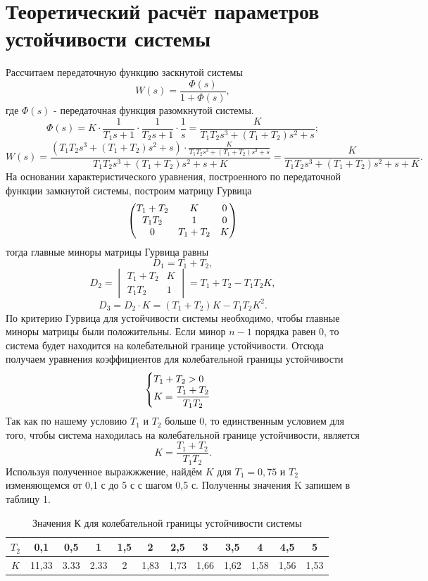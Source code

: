 \documentclass[a4paper, 11pt, russian]{article}
\begin{document}
    \section{Теоретический расчёт параметров устойчивости системы}
    Рассчитаем передаточную функцию заскнутой системы
    $$W(s) = \frac{\Phi(s)}{1 + \Phi(s)},$$ где $\Phi(s)$ - передаточная функция разомкнутой системы.
    $$\Phi(s) = K\cdot\frac{1}{T_1s + 1}\cdot\frac{1}{T_2s + 1}\cdot\frac{1}{s} = \frac{K}{T_1T_2s^3 + (T_1 + T_2)s^2 +s};$$
    $$W(s) = \frac{(T_1T_2s^3 + (T_1 + T_2)s^2 +s)\cdot\displaystyle{\frac{K}{T_1T_2s^3 + (T_1 + T_2)s^2 +s}}}{T_1T_2s^3 + (T_1 + T_2)s^2 +s + K} = \frac{K}{T_1T_2s^3 + (T_1 + T_2)s^2 +s + K}.$$
    На основании характеристического уравнения, построенного по передаточной функции замкнутой системы, построим матрицу Гурвица
    \[
    \begin{pmatrix}
        $$T_1 + T_2$$ & $$K$$ & 0\\
        $$T_1T_2$$ & 1 & 0\\
        0 & $$T_1 + T_2$$ & $$K$$
    \end{pmatrix}
    \]
    тогда главные миноры матрицы Гурвица равны
    $$D_1 = T_1 + T_2,$$
    $$D_2 = 
    \begin{vmatrix}
        T_1 + T_2 & K\\
        T_1T_2 & 1
    \end{vmatrix}
    = T_1 + T_2 - T_1T_2K,$$
    $$D_3 = D_2\cdot K = (T_1 + T_2)K - T_1T_2K^2.$$
    По критерию Гурвица для устойчивости системы необходимо, чтобы главные миноры матрицы были положительны. Если минор $n - 1$ порядка равен 0, то система будет находится на колебательной границе устойчивости. Отсюда получаем уравнения коэффициентов для колебательной границы устойчивости
    \begin{equation*}
        \begin{cases}
            $$T_1 + T_2 > 0$$\\
            $$K = \displaystyle{\frac{T_1 + T_2}{T_1T_2}}$$
        \end{cases}
    \end{equation*}
    Так как по нашему условию $T_1$ и $T_2$ больше 0, то единственным условием для того, чтобы система находилась на колебательной границе устойчивости, является
    $$K = \displaystyle{\frac{T_1 + T_2}{T_1T_2}}.$$
    Используя полученное выражжжение, найдём $K$ для $T_1 = 0,75$ и $T_2$ изменяющемся от 0,1 с до 5 с с шагом 0,5 с. Полученны значения K запишем в таблицу 1.
    \begin{table}[h!]
        \centering
        \caption{Значения К для колебательной границы устойчивости системы}
        \begin{tabular}{c|c|c|c|c|c|c|c|c|c|c|c}
            $T_2$ & 0,1 & 0,5 & 1 & 1,5 & 2 & 2,5 & 3 & 3,5 & 4 & 4,5 & 5 \\
            \hline
            $K$ & 11,33 & 3.33 & 2.33 & 2 & 1,83 & 1,73 & 1,66 & 1,62 & 1,58 & 1,56 & 1,53
        \end{tabular}
    \end{table}
    
\end{document}
